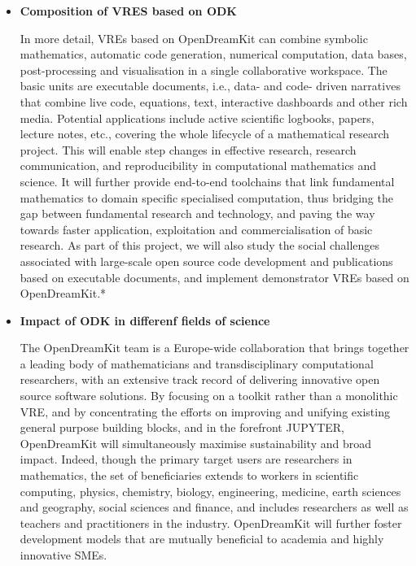 \documentclass[12pta4wide]{amsart}
\begin{document}
\begin{itemize}
\item{\textbf{Composition of VRES based on ODK}}

In more detail, VREs based on OpenDreamKit can combine symbolic mathematics, automatic code generation, numerical
computation, data bases, post-processing and visualisation in a single collaborative workspace. The basic units are executable
documents, i.e., data- and code- driven narratives that combine live code, equations, text, interactive dashboards
and other rich media. Potential applications include active scientific logbooks, papers, lecture notes, etc., covering the whole
lifecycle of a mathematical research project.
This will enable step changes in effective research, research communication, and reproducibility in computational mathematics
and science. It will further provide end-to-end toolchains that link fundamental mathematics to domain specific
specialised computation, thus bridging the gap between fundamental research and technology, and paving the way towards
faster application, exploitation and commercialisation of basic research.
As part of this project, we will also study the social challenges associated with large-scale open source code development
and publications based on executable documents, and implement demonstrator VREs based on OpenDreamKit.*


\item{\textbf{Impact of ODK in differenf fields of science}}

The OpenDreamKit team is a Europe-wide collaboration that brings together a leading body of mathematicians and transdisciplinary
computational researchers, with an extensive track record of delivering innovative open source software solutions.
By focusing on a toolkit rather than a monolithic VRE, and by concentrating the efforts on improving and unifying existing
general purpose building blocks, and in the forefront JUPYTER, OpenDreamKit will simultaneously maximise sustainability
and broad impact. Indeed, though the primary target users are researchers in mathematics, the set of beneficiaries extends
to workers in scientific computing, physics, chemistry, biology, engineering, medicine, earth sciences and geography, social
sciences and finance, and includes researchers as well as teachers and practitioners in the industry. OpenDreamKit will
further foster development models that are mutually beneficial to academia and highly innovative SMEs.

\end{itemize}
\end{document}
